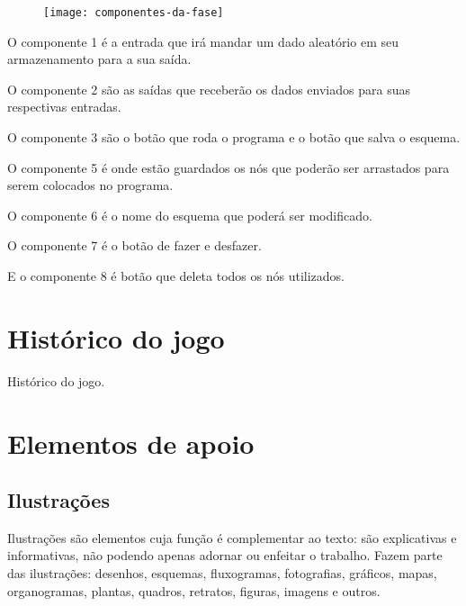 \documentclass[12pt,oneside,a4paper,chapter=TITLE,section=TITLE,sumario
=tradicional]{abntex2}
\begin{document}
\begin{figure}[!h]
    \centering
    \texttt{[image: componentes-da-fase]}
\end{figure}

\vspace{1em}

O componente 1 é a entrada que irá mandar um dado aleatório em seu armazenamento para a sua saída.

O componente 2 são as saídas que receberão os dados enviados para suas respectivas entradas.

O componente 3 são o botão que roda o programa e o botão que salva o esquema.

O componente 5 é onde estão guardados os nós que poderão ser arrastados para serem colocados no programa.

O componente 6 é o nome do esquema que poderá ser modificado.

O componente 7 é o botão de fazer e desfazer.

E o componente 8 é botão que deleta todos os nós utilizados.

\chapter{Histórico do jogo}
\label{cap:historico-do-jogo}

Histórico do jogo.

\chapter{Elementos de apoio}
\label{cap:apoio}

\section{Ilustrações}
\label{cap:ilustracoes}

Ilustrações são elementos cuja função é complementar ao texto: são explicativas 
e informativas, não podendo apenas adornar ou enfeitar o trabalho. Fazem parte 
das ilustrações: desenhos, esquemas, fluxogramas, fotografias, gráficos, mapas, 
organogramas, plantas, quadros, retratos, figuras, imagens e outros.
\end{document}
